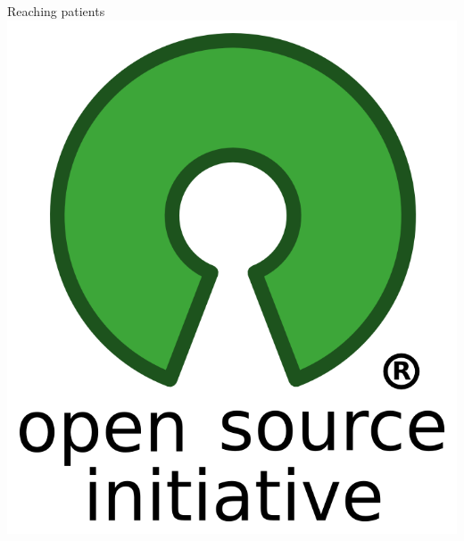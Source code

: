 \documentclass[graphics]{beamer}
\begin{document}
\begin{frame}{Reaching patients}
	\includegraphics[scale=0.07]{opensource}
\end{frame}
\end{document}
